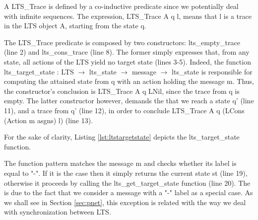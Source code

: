 	
			


	\noindent A \textsf{LTS\_Trace} is defined by a co-inductive predicate since we potentially deal
	with infinite sequences. The expression, \textsf{LTS\_Trace A q l}, means that \textsf{l} is a trace
	in the \textsf{LTS} object \textsf{A}, starting from the state \textsf{q}.   

		The \textsf{LTS\_Trace} predicate is composed by two constructors: \textsf{lts\_empty\_trace} (line 2)
	and \textsf{lts\_cons\_trace} (line 8).  The former simply expresses that, from any state, 
	all \textsf{actions} of the \textsf{LTS} yield no target state (lines 3-5). Indeed, the
	function 
	\textsf{lts\_target\_state : LTS $\rightarrow$ lts\_state $\rightarrow$ message $\rightarrow$ lts\_state}
	is responsible for computing the attained state from \textsf{q} with an \textsf{action} holding the message
	\textsf{m}. Thus, the constructor's conclusion is \textsf{LTS\_Trace A q LNil}, since the trace from \textsf{q}
	is empty.	The latter constructor however, demands the that we reach a state \textsf{q'} (line 11), and
	a trace from \textsf{q'} (line 12), in order to conclude \textsf{LTS\_Trace A q (LCons (Action m asgns) l)} (line 13).
	
		For the sake of clarity, Listing \ref{lst:ltstargetstate} depicts the \textsf{lts\_target\_state} function.	
	
					
	
	
	\noindent The function pattern matches the \textsf{message m} and checks whether its label
	is equal to \textsf{"-"}. If it is the case then it simply returns the current state \textsf{st} (line 19),
	otherwise it proceeds by calling the \textsf{lts\_get\_target\_state} function (line 20).
	The is due to the fact that we consider a \textsf{message} with a \textsf{"-"} label as
	a special case. As we shall see in Section \ref{sec:pnet}, this exception is related with the 
	way we deal with synchronization between \ac{LTS}.
	
